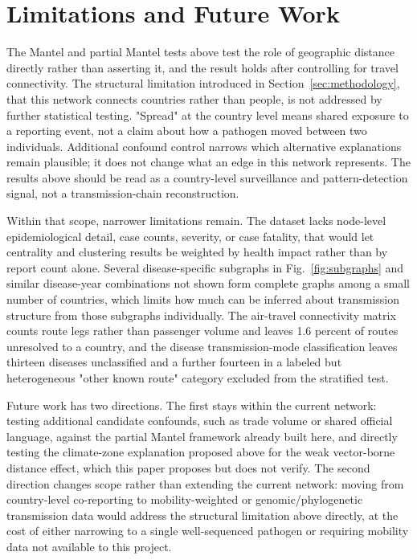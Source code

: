 \documentclass[11pt]{article}
\begin{document}
\FloatBarrier

\section{Limitations and Future Work}
\label{sec:limitations}

The Mantel and partial Mantel tests above test the role of geographic distance directly
rather than asserting it, and the result holds after controlling for travel connectivity.
The structural limitation introduced in Section~\ref{sec:methodology}, that this network
connects countries rather than people, is not addressed by further statistical testing.
"Spread" at the country level means shared exposure to a reporting event, not a claim about
how a pathogen moved between two individuals. Additional confound control narrows which
alternative explanations remain plausible; it does not change what an edge in this network
represents. The results above should be read as a country-level surveillance and
pattern-detection signal, not a transmission-chain reconstruction.

Within that scope, narrower limitations remain. The dataset lacks node-level epidemiological
detail, case counts, severity, or case fatality, that would let centrality and clustering
results be weighted by health impact rather than by report count alone. Several
disease-specific subgraphs in Fig.~\ref{fig:subgraphs} and similar disease-year combinations
not shown form complete graphs among a small number of countries, which limits how much can
be inferred about transmission structure from those subgraphs individually. The air-travel
connectivity matrix counts route legs rather than passenger volume and leaves 1.6 percent of
routes unresolved to a country, and the disease transmission-mode classification leaves
thirteen diseases unclassified and a further fourteen in a labeled but heterogeneous "other
known route" category excluded from the stratified test.

Future work has two directions. The first stays within the current network: testing
additional candidate confounds, such as trade volume or shared official language, against
the partial Mantel framework already built here, and directly testing the climate-zone
explanation proposed above for the weak vector-borne distance effect, which this paper
proposes but does not verify. The second direction changes scope rather than extending the
current network: moving from country-level co-reporting to mobility-weighted or
genomic/phylogenetic transmission data would address the structural limitation above
directly, at the cost of either narrowing to a single well-sequenced pathogen or requiring
mobility data not available to this project.
\end{document}
